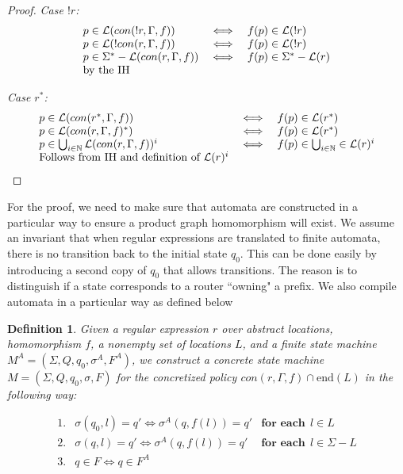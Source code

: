 \documentclass[twocolumn, openany]{sig-alternate-10pt}
\newcommand{\EndR}{\ensuremath{\mathrm{end}}}
\newtheorem{defn}{Definition}
\begin{document}
\begin{proof}
\emph{Case $!r$:}
  \[ \begin{array}{lll}
    p \in \mathcal{L}(con(!r,\Gamma,f)) &\iff& f(p) \in \mathcal{L}(!r) \\
    p \in \mathcal{L}(!con(r,\Gamma,f)) &\iff& f(p) \in \mathcal{L}(!r) \\
    p \in \Sigma^* - \mathcal{L}(con(r,\Gamma,f)) &\iff& f(p) \in \Sigma^* - \mathcal{L}(r) \\
    \text{by the IH} & & \\
  \end{array} \]

\emph{Case $r^*$:}
  \[ \begin{array}{lll}
    p \in \mathcal{L}(con(r^*,\Gamma,f)) &\iff& f(p) \in \mathcal{L}(r^*) \\
    p \in \mathcal{L}(con(r,\Gamma,f)^*) &\iff& f(p) \in \mathcal{L}(r^*) \\
    p \in \bigcup_{i \in \mathbb{N}} \mathcal{L}(con(r,\Gamma,f))^i &\iff& f(p) \in \bigcup_{i \in \mathbb{N}} \in \mathcal{L}(r)^i \\
    \text{Follows from IH and definition of } \mathcal{L}(r)^i & & \\
  \end{array} \]

\end{proof}



\vspace{1em}
For the proof, we need to make sure that automata are constructed in a particular way to ensure a product graph homomorphism will exist. We assume an invariant that when regular expressions are translated to finite automata, there is no transition back to the initial state $q_0$. This can be done easily by introducing a second copy of $q_0$ that allows transitions. The reason is to distinguish if a state corresponds to a router ``owning" a prefix. We also compile automata in a particular way as defined below

\begin{defn}
Given a regular expression $r$ over abstract locations, homomorphism $f$, a nonempty set of locations $L$, and a finite state machine $M^A = (\Sigma,Q,q_0,\sigma^A,F^A)$, we construct a concrete state machine $M = (\Sigma, Q, q_0, \sigma, F)$ for the concretized policy $con(r,\Gamma, f) \cap \EndR(L)$ in the following way: 

    \[ \begin{array}{lll}
      1. & \sigma(q_0,l) = q' \iff \sigma^A(q,f(l)) = q' & \textbf{for each}~~ l \in L \\
      2. & \sigma(q,l) = q' \iff \sigma^A(q,f(l)) = q' & \textbf{for each}~~ l \in \Sigma - L \\
      3. & q \in F \iff q \in F^A & \\
    \end{array} \]
\end{defn}
\end{document}
